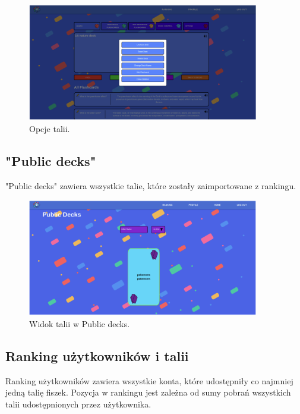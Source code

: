 \begin{figure}[H]
    \centering
    \includegraphics[width=0.9\textwidth]{chapters/chapter_10/images_web/web_settings}
    \caption{Opcje talii.}
    \label{img:web_settings}
\end{figure}


\subsection{"Public decks"}
"Public decks" zawiera wszystkie talie, które zostały zaimportowane z rankingu.


\begin{figure}[H]
    \centering
    \includegraphics[width=0.9\textwidth]{chapters/chapter_10/images_web/web_public_decks}
    \caption{Widok talii w Public decks.}
    \label{img:web_public_decks}
\end{figure}


\subsection{Ranking użytkowników i talii}
Ranking użytkowników zawiera wszystkie konta, które udostępniły co najmniej jedną talię fiszek. Pozycja w rankingu jest zależna od sumy pobrań wszystkich talii udostępnionych przez użytkownika.


